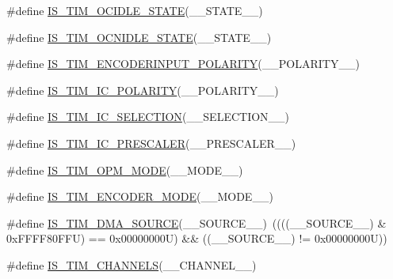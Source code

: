 \begin{DoxyCompactItemize}
\#define \hyperlink{group___t_i_m___private___macros_ga7c2f6448bbecfc404a3644cc5c978789}{I\+S\+\_\+\+T\+I\+M\+\_\+\+O\+C\+I\+D\+L\+E\+\_\+\+S\+T\+A\+TE}(\+\_\+\+\_\+\+S\+T\+A\+T\+E\+\_\+\+\_\+)
\item 
\#define \hyperlink{group___t_i_m___private___macros_ga716c8082a9f18e07c876aa528a3f128d}{I\+S\+\_\+\+T\+I\+M\+\_\+\+O\+C\+N\+I\+D\+L\+E\+\_\+\+S\+T\+A\+TE}(\+\_\+\+\_\+\+S\+T\+A\+T\+E\+\_\+\+\_\+)
\item 
\#define \hyperlink{group___t_i_m___private___macros_ga6fde3e02e00bbf2a87a6691580751205}{I\+S\+\_\+\+T\+I\+M\+\_\+\+E\+N\+C\+O\+D\+E\+R\+I\+N\+P\+U\+T\+\_\+\+P\+O\+L\+A\+R\+I\+TY}(\+\_\+\+\_\+\+P\+O\+L\+A\+R\+I\+T\+Y\+\_\+\+\_\+)
\item 
\#define \hyperlink{group___t_i_m___private___macros_ga346707dd1b0915436ca3f58dcfbef3d5}{I\+S\+\_\+\+T\+I\+M\+\_\+\+I\+C\+\_\+\+P\+O\+L\+A\+R\+I\+TY}(\+\_\+\+\_\+\+P\+O\+L\+A\+R\+I\+T\+Y\+\_\+\+\_\+)
\item 
\#define \hyperlink{group___t_i_m___private___macros_ga3b370e1454433066201e9f09cb47173f}{I\+S\+\_\+\+T\+I\+M\+\_\+\+I\+C\+\_\+\+S\+E\+L\+E\+C\+T\+I\+ON}(\+\_\+\+\_\+\+S\+E\+L\+E\+C\+T\+I\+O\+N\+\_\+\+\_\+)
\item 
\#define \hyperlink{group___t_i_m___private___macros_ga86558ff4924a0526ce7593db238a17ab}{I\+S\+\_\+\+T\+I\+M\+\_\+\+I\+C\+\_\+\+P\+R\+E\+S\+C\+A\+L\+ER}(\+\_\+\+\_\+\+P\+R\+E\+S\+C\+A\+L\+E\+R\+\_\+\+\_\+)
\item 
\#define \hyperlink{group___t_i_m___private___macros_ga38ab7126db5202ad9a465838160a805c}{I\+S\+\_\+\+T\+I\+M\+\_\+\+O\+P\+M\+\_\+\+M\+O\+DE}(\+\_\+\+\_\+\+M\+O\+D\+E\+\_\+\+\_\+)
\item 
\#define \hyperlink{group___t_i_m___private___macros_ga481a8b96f840e75c5df82a99ebabc778}{I\+S\+\_\+\+T\+I\+M\+\_\+\+E\+N\+C\+O\+D\+E\+R\+\_\+\+M\+O\+DE}(\+\_\+\+\_\+\+M\+O\+D\+E\+\_\+\+\_\+)
\item 
\#define \hyperlink{group___t_i_m___private___macros_ga6a33061de13fdde7df1a85d2402e69c9}{I\+S\+\_\+\+T\+I\+M\+\_\+\+D\+M\+A\+\_\+\+S\+O\+U\+R\+CE}(\+\_\+\+\_\+\+S\+O\+U\+R\+C\+E\+\_\+\+\_\+)~((((\+\_\+\+\_\+\+S\+O\+U\+R\+C\+E\+\_\+\+\_\+) \& 0x\+F\+F\+F\+F80\+F\+F\+U) == 0x00000000\+U) \&\& ((\+\_\+\+\_\+\+S\+O\+U\+R\+C\+E\+\_\+\+\_\+) != 0x00000000\+U))
\item 
\#define \hyperlink{group___t_i_m___private___macros_ga3641d445a28293a77ddc2232e624a858}{I\+S\+\_\+\+T\+I\+M\+\_\+\+C\+H\+A\+N\+N\+E\+LS}(\+\_\+\+\_\+\+C\+H\+A\+N\+N\+E\+L\+\_\+\+\_\+)
\item 

\end{DoxyCompactItemize}

